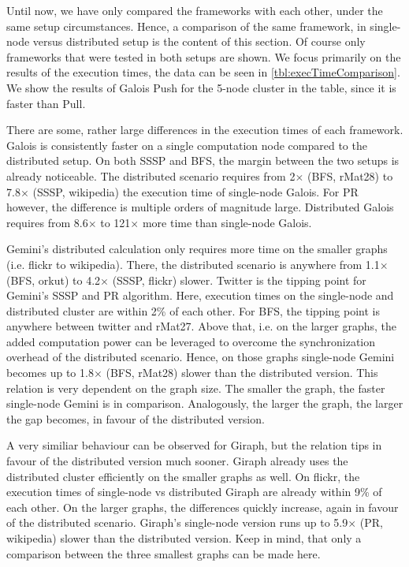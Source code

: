 Until now, we have only compared the frameworks with each other, under the same setup circumstances. Hence, a comparison of the same framework, in single-node versus distributed setup is the content of this section.
Of course only frameworks that were tested in both setups are shown.
We focus primarily on the results of the execution times, the data can be seen in \autoref{tbl:execTimeComparison}. We show the results of Galois Push for the 5-node cluster in the table, since it is faster than Pull.

There are some, rather large differences in the execution times of each framework. Galois is consistently faster on a single computation node compared to the distributed setup. 
On both SSSP and BFS, the margin between the two setups is already noticeable. The distributed scenario requires from 2$\times$ (BFS, rMat28) to 7.8$\times$ (SSSP, wikipedia) the execution time of single-node Galois.
For PR however, the difference is multiple orders of magnitude large. Distributed Galois requires from 8.6$\times$ to 121$\times$ more time than single-node Galois. 

Gemini's distributed calculation only requires more time on the smaller graphs (i.e. flickr to wikipedia). There, the distributed scenario is anywhere from 1.1$\times$ (BFS, orkut) to 4.2$\times$ (SSSP, flickr) slower.
Twitter is the tipping point for Gemini's SSSP and PR algorithm. Here, execution times on the single-node and distributed cluster are within 2\% of each other. For BFS, the tipping point is anywhere between twitter and rMat27.
Above that, i.e. on the larger graphs, the added computation power can be leveraged to overcome the synchronization overhead of the distributed scenario. Hence, on those graphs single-node Gemini becomes up to 1.8$\times$ (BFS, rMat28) slower than the distributed version.
This relation is very dependent on the graph size. The smaller the graph, the faster single-node Gemini is in comparison. Analogously, the larger the graph, the larger the gap becomes, in favour of the distributed version.

A very similiar behaviour can be observed for Giraph, but the relation tips in favour of the distributed version much sooner. Giraph already uses the distributed cluster efficiently on the smaller graphs as well.
On flickr, the execution times of single-node vs distributed Giraph are already within 9\% of each other.
On the larger graphs, the differences quickly increase, again in favour of the distributed scenario. Giraph's single-node version runs up to 5.9$\times$ (PR, wikipedia) slower than the distributed version.
Keep in mind, that only a comparison between the three smallest graphs can be made here.



